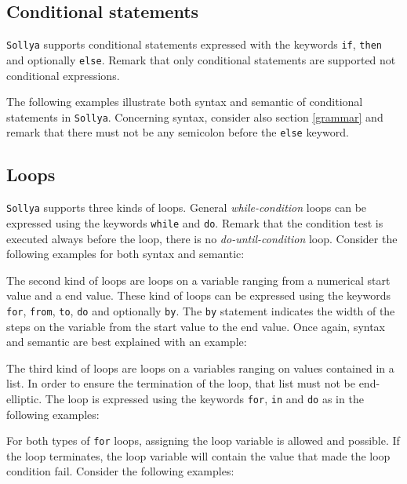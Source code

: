 \documentclass[a4paper]{article}
\newcommand{\key}[1]{\texttt{#1}}
\newcommand{\sollya}{\texttt{Sollya}\xspace}
\begin{document}


\subsection{Conditional statements}

\sollya supports conditional statements expressed with the keywords
\key{if}, \key{then} and optionally \key{else}. Remark that only
conditional statements are supported not conditional expressions. 

The following examples illustrate both syntax and semantic of
conditional statements in \sollya. Concerning syntax, consider also
section \ref{grammar} and remark that there must not be any semicolon
before the \key{else} keyword.



\subsection{Loops}

\sollya supports three kinds of loops. General \emph{while-condition}
loops can be expressed using the keywords \key{while} and
\key{do}. Remark that the condition test is executed always before the
loop, there is no \emph{do-until-condition} loop. Consider the following 
examples for both syntax and semantic:



The second kind of loops are loops on a variable ranging from a
numerical start value and a end value. These kind of loops can be
expressed using the keywords \key{for}, \key{from}, \key{to}, \key{do}
and optionally \key{by}. The \key{by} statement indicates the width of
the steps on the variable from the start value to the end value. Once
again, syntax and semantic are best explained with an example:



The third kind of loops are loops on a variables ranging on values
contained in a list. In order to ensure the termination of the loop,
that list must not be end-elliptic. The loop is expressed using the
keywords \key{for}, \key{in} and \key{do} as in the following
examples:



For both types of \key{for} loops, assigning the loop variable is
allowed and possible. If the loop terminates, the loop variable will
contain the value that made the loop condition fail. Consider the
following examples:
\end{document}

